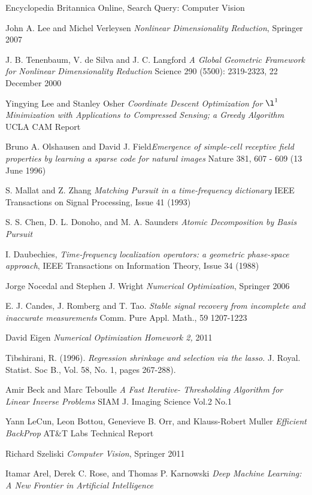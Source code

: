 \documentclass[12pt,a4paper]{article}
\begin{document}
  \begin{thebibliography}{1}

   Encyclopedia Britannica Online, Search Query: Computer Vision

   John A. Lee and Michel Verleysen {\em Nonlinear Dimensionality Reduction}, Springer 2007 

   J. B. Tenenbaum, V. de Silva and J. C. Langford {\em A Global Geometric Framework for Nonlinear
Dimensionality Reduction} Science 290 (5500): 2319-2323, 22 December 2000 

   Yingying Lee and Stanley Osher {\em Coordinate Descent Optimization for $\l^1$ Minimization with Applications to Compressed Sensing; a Greedy Algorithm} UCLA CAM Report
  
   Bruno A. Olshausen and David J. Field{\em Emergence of simple-cell receptive field properties by learning a sparse code for natural images} Nature 381, 607 - 609 (13 June 1996)
  
   S. Mallat and Z. Zhang {\em Matching Pursuit in a time-frequency dictionary} IEEE Transactions on Signal Processing, Issue 41 (1993)
  
   S. S. Chen, D. L. Donoho, and M. A. Saunders {\em Atomic Decomposition by Basis Pursuit}  
  
   I. Daubechies, {\em Time-frequency localization operators: a geometric phase-space approach}, IEEE Transactions on Information Theory, Issue 34 (1988)  
  
   Jorge Nocedal and Stephen J. Wright {\em Numerical Optimization}, Springer 2006  
  
   E. J. Candes, J. Romberg and T. Tao. {\em Stable signal recovery from incomplete and inaccurate measurements} Comm. Pure Appl. Math., 59 1207-1223
  
   David Eigen {\em Numerical Optimization Homework 2,} 2011  
  
   Tibshirani, R. (1996). {\em Regression shrinkage and selection via the lasso.} J. Royal. Statist. Soc B., Vol. 58, No. 1, pages 267-288).

   Amir Beck and Marc Teboulle {\em A Fast Iterative- Thresholding Algorithm for Linear Inverse Problems} SIAM J. Imaging Science Vol.2 No.1
  
   Yann LeCun, Leon Bottou, Genevieve B. Orr, and Klauss-Robert Muller {\em Efficient BackProp} AT\&T Labs Technical Report
  
   Richard Szeliski {\em Computer Vision}, Springer 2011
  
   Itamar Arel, Derek C. Rose, and Thomas P. Karnowski {\em Deep Machine Learning: A New Frontier in Artificial Intelligence} 

  \end{thebibliography}

  
  
  
  
\end{document}
